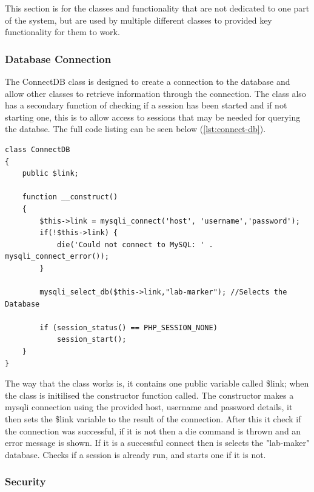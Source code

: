 \documentclass[12pt]{article}  %
\begin{document}
This section is for the classes and functionality that are not dedicated to one part of the system, but are used by multiple different classes to provided key functionality for them to work.  

\subsubsection{Database Connection}

The ConnectDB class is designed to create a connection to the database and allow other classes to retrieve information through the connection. The class also has a secondary function of checking if a session has been started and if not starting one, this is to allow access to sessions that may be needed for querying the databse. The full code listing can be seen below (\ref{lst:connect-db}).

\singlespacing
\begin{lstlisting}[basicstyle=\linespread{0.8}, caption= Database Connection Class, label = lst:connect-db]
class ConnectDB
{
    public $link;

    function __construct()
    {
        $this->link = mysqli_connect('host', 'username','password');
        if(!$this->link) {
            die('Could not connect to MySQL: ' . mysqli_connect_error());
        }

        mysqli_select_db($this->link,"lab-marker"); //Selects the Database

        if (session_status() == PHP_SESSION_NONE)
            session_start();
    }
}
\end{lstlisting}
\doublespacing

\noindent The way that the class works is, it contains one public variable called \$link; when the class is initilised the constructor function called. The constructor makes a mysqli connection using the provided host, username and password details, it then sets the \$link variable to the result of the connection. After this it check if the connection was successful, if it is not then a die command is thrown and an error message is shown. If it is a successful connect then is selects the "lab-maker" database. Checks if a session is already run, and starts one if it is not.

\subsubsection{Security}
\end{document}
